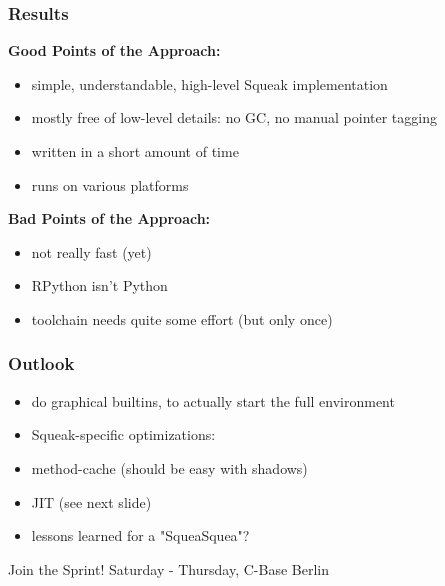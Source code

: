 \documentclass[utf8x]{beamer}
\begin{document}
\begin{frame}
    \frametitle{Results}
    {\bf Good Points of the Approach:}
    \begin{itemize}
    \item simple, understandable, high-level Squeak implementation
    \item mostly free of low-level details: no GC, no manual pointer tagging
    \item written in a short amount of time
    \item runs on various platforms
    \end{itemize}
    \pause
    {\bf Bad Points of the Approach:}
    \begin{itemize}
    \item not really fast (yet)
    \item RPython isn't Python
    \item toolchain needs quite some effort (but only once)
    \end{itemize}
\end{frame}


\begin{frame}
    \frametitle{Outlook}
    \begin{itemize}
    \item do graphical builtins, to actually start the full environment
    \item Squeak-specific optimizations:
    \item method-cache (should be easy with shadows)
    \item JIT (see next slide)
    \item lessons learned for a "SqueaSquea"?
    \end{itemize}
  \begin{block}{
    Join the Sprint!}
    \bigskip
    \hskip 1cm Saturday - Thursday, C-Base Berlin
    \bigskip
  \end{block}
\end{frame}
\end{document}
